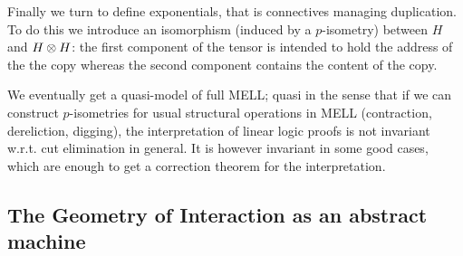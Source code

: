Finally we turn to define exponentials, that is connectives managing
duplication. To do this we introduce an isomorphism (induced by a
\(p\)-isometry) between \(H\) and \(H\otimes H\): the first component of
the tensor is intended to hold the address of the the copy whereas the
second component contains the content of the copy.

We eventually get a quasi-model of full MELL; quasi in the sense that if
we can construct \(p\)-isometries for usual structural operations in
MELL (contraction, dereliction, digging), the interpretation of linear
logic proofs is not invariant w.r.t. cut elimination in general. It is
however invariant in some good cases, which are enough to get a
correction theorem for the interpretation.


\subsection{The Geometry of Interaction as an abstract machine}\label{the-geometry-of-interaction-as-an-abstract-machine}

